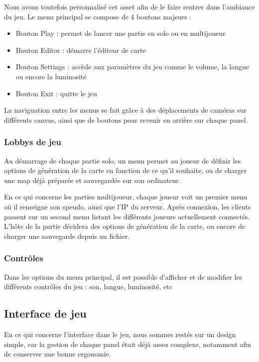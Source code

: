 \documentclass[12pt]{report}
\begin{document}
Nous avons toutefois personnalisé cet asset afin de le faire rentrer dans
l'ambiance du jeu. Le menu principal se compose de 4 boutons majeurs :

\begin{itemize}
    \item Bouton Play : permet de lancer une partie en solo ou en multijoueur
    \item Bouton Editor : démarre l'éditeur de carte
    \item Bouton Settings : accède aux paramètres du jeu comme le volume, la
        langue ou encore la luminosité
    \item Bouton Exit : quitte le jeu
\end{itemize}

La naviguation entre les menus se fait grâce à des déplacements de caméras sur
différents canvas, ainsi que de boutons pour revenir en arrière sur chaque
panel.

\subsubsection{Lobbys de jeu}

Au démarrage de chaque partie solo, un menu permet au joueur de définir les
options de génération de la carte en fonction de ce qu’il souhaite, ou de
charger une map déjà préparée et sauvegardée sur son ordinateur.

En ce qui concerne les parties multijoueur, chaque joueur voit un premier menu
où il renseigne son speudo, ainsi que l'IP du serveur. Après connexion, les
clients passent sur un second menu listant les différents joueurs actuellement
connectés. L'hôte de la partie décidera des options de génération de la carte,
ou encore de charger une sauvegarde depuis un fichier.

\subsubsection{Contrôles}

Dans les options du menu principal, il est possible d’afficher et de modifier
les différents contrôles du jeu : son, langue, luminosité, etc

\subsection{Interface de jeu}

En ce qui concerne l’interface dans le jeu, nous sommes restés sur un design simple, 
car la gestion de chaque panel était déjà assez complexe, notamment afin de conserver 
une bonne ergonomie.
\end{document}
